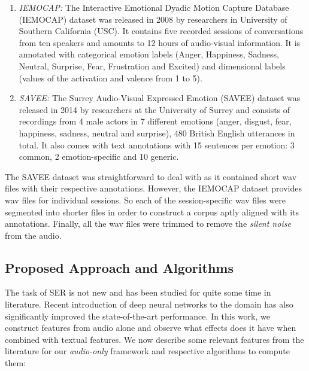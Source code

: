 \documentclass[11pt,a4paper]{article}
\begin{document}
\begin{enumerate}
\item \textit{IEMOCAP:} The Interactive Emotional Dyadic Motion Capture Database (IEMOCAP) dataset \cite{busso2008iemocap} was released in 2008 by researchers in University of Southern California (USC). It contains five recorded sessions of conversations from ten speakers and amounts to 12 hours of audio-visual information. It is annotated with categorical emotion labels (Anger, Happiness, Sadness, Neutral, Surprise, Fear, Frustration and Excited) and dimensional labels (values of the activation and valence from 1 to 5).


\item \textit{SAVEE:} The Surrey Audio-Visual Expressed Emotion (SAVEE) dataset \cite{jackson2014surrey} was released in 2014 by researchers at the University of Surrey and consists of recordings from 4 male actors in 7 different emotions (anger, disgust, fear, happiness, sadness, neutral and surprise), 480 British English utterances in total. It also comes with text annotations with 15 sentences per emotion: 3 common, 2 emotion-specific and 10 generic.
\end{enumerate}

The SAVEE dataset was straightforward to deal with as it contained short wav files with their respective annotations. However, the IEMOCAP dataset provides wav files for individual sessions. So each of the session-specific wav files were segmented into shorter files in order to construct a corpus aptly aligned with its annotations. Finally, all the wav files were trimmed to remove the \textit{silent noise} from the audio.

\subsection*{Proposed Approach and Algorithms}
The task of SER is not new and has been studied for quite some time in literature. Recent introduction of deep neural networks to the domain has also significantly improved the state-of-the-art performance. In this work, we construct features from audio alone and observe what effects does it have when combined with textual features. We now describe some relevant features from the literature \cite{ververidis2006emotional} for our \textit{audio-only} framework and respective algorithms to compute them:
\end{document}
